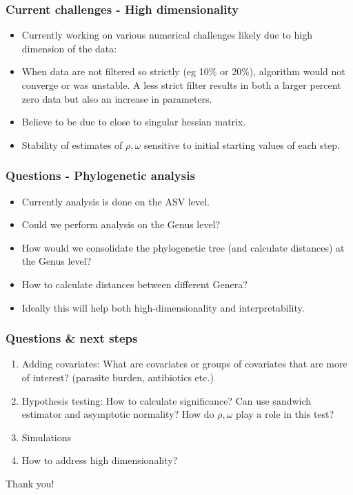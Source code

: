 \documentclass{beamer}
\begin{document}
\begin{frame}
\frametitle{Current challenges - High dimensionality}
\begin{itemize}
  \item Currently working on various numerical challenges likely due to high dimension of the data:
  \item When data are not filtered so strictly (eg 10\% or 20\%), algorithm would not converge or was unstable. A less strict filter results in both a larger percent zero data but also an increase in parameters.
  \item Believe to be due to close to singular hessian matrix.
  \item Stability of estimates of $\rho, \omega$ sensitive to initial starting values of each step.
\end{itemize}
\end{frame}
\begin{frame}
\frametitle{Questions - Phylogenetic analysis}
\begin{itemize}
  \item Currently analysis is done on the ASV level.
  \item Could we perform analysis on the Genus level?
  \item How would we consolidate the phylogenetic tree (and calculate distances) at the Genus level?
  \item How to calculate distances between different Genera?
  \item Ideally this will help both high-dimensionality and interpretability.
\end{itemize}
\end{frame}

\begin{frame}
\frametitle{Questions \& next steps}
\begin{enumerate}
  \item Adding covariates: What are covariates or groups of covariates that are more of interest? (parasite burden, antibiotics etc.)
  \item Hypothesis testing: How to calculate significance? Can use sandwich estimator and asymptotic normality? How do $\rho, \omega$ play a role in this test?
  \item Simulations
  \item How to address high dimensionality?
\end{enumerate}
\end{frame}



\begin{frame}

\Huge{\centerline{Thank you!}}

\end{frame}





  
\end{document}
